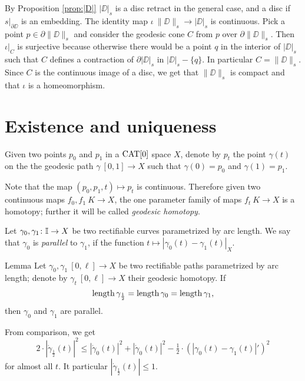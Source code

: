 \documentclass{article}
\begin{document}
By Proposition \ref{prop:|D|} $|\DD|_s$ is a disc retract in the general case, and a disc if $s|_{\partial\DD}$ is an embedding.
The identity map $\iota\:\|\DD\|_s\to |\DD|_s$ is continuous.
Pick a point $p\in\partial\|\DD\|_s$ and consider the geodesic 
cone $C$ from $p$ over $\partial\|\DD\|_s$.
Then $\iota|_C$ is surjective because otherwise there would be a point $q$ in the 
interior of $|\DD|_s$ such that $C$ defines a contraction of $\partial|\DD|_s$ in $|\DD|_s-\{q\}$. 
In particular $C=\|\DD\|_s$.
Since $C$ is the continuous image of a disc, we get that $\|\DD\|_s$ is compact and that $\iota$ is a homeomorphism.
\qeds













\section{Existence and uniqueness}\label{Existence and uniqueness}

Given two points $p_0$ and $p_1$ in a $\mathop{\rm CAT}\nolimits[0]$ space $X$,
denote by $p_t$ the point $\gamma(t)$ on the 
the geodesic path $\gamma\:[0,1]\to X$ such that $\gamma(0)=p_0$ and $\gamma(1)=p_1$.

Note that the map $(p_0,p_1,t)\mapsto p_t$ is continuous.
Therefore given two continuous maps $f_0,f_1\:K\to X$,
the one parameter family of maps $f_t\:K\to X$ is a homotopy;
further it will be called \emph{geodesic homotopy}.

Let $\gamma_{0}, \gamma_1\colon\mathbb{I}\to X$ be two rectifiable curves parametrized by arc length. 
We say that  $\gamma_{0}$ is {\em parallel} to $\gamma_{1}$, if the function $t\mapsto |\gamma_{0}(t)-\gamma_{1}(t)|_X$.


\begin{thm}{Lemma}\label{lem:parpaths}
Let $\gamma_0,\gamma_1\:[0,\ell]\to X$ be two rectifiable paths parametrized by arc length;
denote by $\gamma_t\:[0,\ell]\to X$ their geodesic homotopy. 
If 
\[\mathop{\rm length}\nolimits\gamma_{\frac12}
=\mathop{\rm length}\nolimits\gamma_0
=\mathop{\rm length}\nolimits\gamma_1,\] 
then $\gamma_{0}$ and $\gamma_{1}$ are parallel. 
\end{thm}

From comparison, we get
\[2\cdot|\dot\gamma_{\frac12}(t)|^2
\le
|\dot\gamma_{0}(t)|^2
+|\dot\gamma_{0}(t)|^2
-\tfrac12\cdot(|\gamma_{0}(t)-\gamma_{1}(t)|')^2\] 
for almost all $t$.
It particular $|\dot\gamma_{\frac12}(t)|\le 1$.
\end{document}
